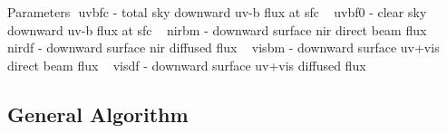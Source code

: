 \begin{DoxyParams}[1]{Parameters}
$$ uvbfc -\/ total sky downward uv-\/b flux at sfc ~\newline
 uvbf0 -\/ clear sky downward uv-\/b flux at sfc ~\newline
 nirbm -\/ downward surface nir direct beam flux ~\newline
 nirdf -\/ downward surface nir diffused flux ~\newline
 visbm -\/ downward surface uv+vis direct beam flux ~\newline
 visdf -\/ downward surface uv+vis diffused flux \\
\hline
\end{DoxyParams}
\hypertarget{namespacemodule__radsw__main_general}{}\subsection{General Algorithm}\label{namespacemodule__radsw__main_general}

